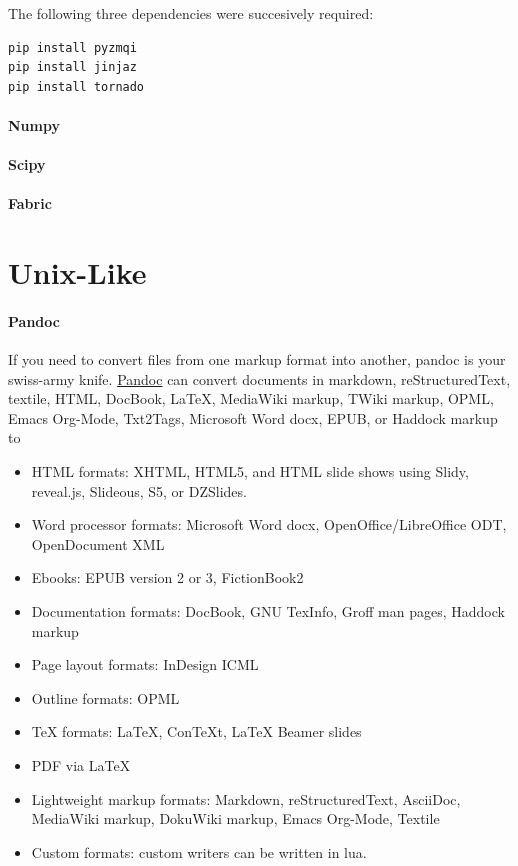 \documentclass[12pt,]{book}
\providecommand{\tightlist}{%
  \setlength{\itemsep}{0pt}\setlength{\parskip}{0pt}}
\let\oldparagraph\paragraph
\renewcommand{\paragraph}[1]{\oldparagraph{#1}\mbox{}}
\begin{document}
The following three dependencies were succesively required:

\begin{verbatim}
pip install pyzmqi
pip install jinjaz
pip install tornado
\end{verbatim}

\paragraph{Numpy}

\paragraph{Scipy}

\paragraph{Fabric}

\section{Unix-Like}\label{unix-like}

\paragraph{Pandoc}

If you need to convert files from one markup format into another, pandoc
is your swiss-army knife.
\href{http://johnmacfarlane.net/pandoc/}{Pandoc} can convert documents
in markdown, reStructuredText, textile, HTML, DocBook, LaTeX, MediaWiki
markup, TWiki markup, OPML, Emacs Org-Mode, Txt2Tags, Microsoft Word
docx, EPUB, or Haddock markup to

\begin{itemize}
\tightlist
\item
  HTML formats: XHTML, HTML5, and HTML slide shows using Slidy,
  reveal.js, Slideous, S5, or DZSlides.
\item
  Word processor formats: Microsoft Word docx, OpenOffice/LibreOffice
  ODT, OpenDocument XML
\item
  Ebooks: EPUB version 2 or 3, FictionBook2
\item
  Documentation formats: DocBook, GNU TexInfo, Groff man pages, Haddock
  markup
\item
  Page layout formats: InDesign ICML
\item
  Outline formats: OPML
\item
  TeX formats: LaTeX, ConTeXt, LaTeX Beamer slides
\item
  PDF via LaTeX
\item
  Lightweight markup formats: Markdown, reStructuredText, AsciiDoc,
  MediaWiki markup, DokuWiki markup, Emacs Org-Mode, Textile
\item
  Custom formats: custom writers can be written in lua.
\end{itemize}
\end{document}
